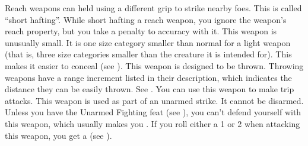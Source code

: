         Reach weapons can held using a different grip to strike nearby foes. This is called ``short hafting''. While short hafting a reach weapon, you ignore the weapon's reach property, but you take a  penalty to accuracy with it.
         This weapon is unusually small. It is one size category smaller than normal for a light weapon (that is, three size categories smaller than the creature it is intended for). This makes it easier to conceal (see ).
         This weapon is designed to be thrown. Throwing weapons have a range increment listed in their description, which indicates the distance they can be easily thrown. See .
         You can use this weapon to make trip attacks.  %
         This weapon is used as part of an unarmed strike. It cannot be disarmed. Unless you have the Unarmed Fighting feat (see ), you can't defend yourself with this weapon, which usually makes you .
         If you roll either a 1 or 2 when attacking this weapon, you get a  (see ).

